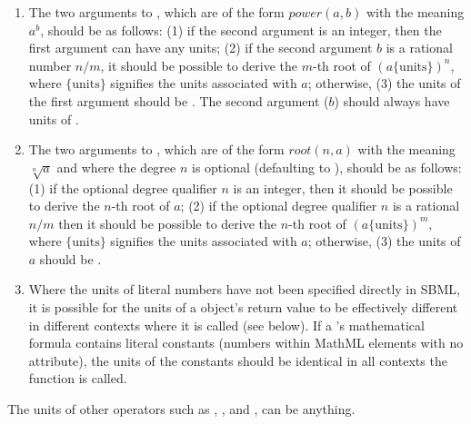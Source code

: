 \begin{enumerate}
\item The two arguments to , which are of the form
  $\textit{power}(a,b)$ with the meaning $a^b$, should be as
  follows: (1) if the second argument is an integer, then the
  first argument can have any units; (2) if the second argument
  $b$ is a rational number $n/m$, it should be possible to derive
  the $m$-th root of $(a \{\text{units}\})^n$, where
  $\{\text{units}\}$ signifies the units associated with $a$;
  otherwise, (3) the units of the first argument should be
  .  The second argument ($b$) should always
  have units of .

\item The two arguments to , which are of the form
  $\textit{root}(n,a)$ with the meaning $\sqrt[n]{a}$ and where
  the degree $n$ is optional (defaulting to ), should be as
  follows: (1) if the optional degree qualifier $n$ is an integer,
  then it should be possible to derive the $n$-th root of $a$; (2)
  if the optional degree qualifier $n$ is a rational $n/m$ then it
  should be possible to derive the $n$-th root of $(a
  \{\text{units}\})^m$, where $\{\text{units}\}$ signifies the
  units associated with $a$; otherwise, (3) the units of $a$ should
  be .

\item Where the units of literal numbers have not been specified
  directly in SBML, it is possible for the units of a
  \FunctionDefinition object's return value to be effectively
  different in different contexts where it is called (see below).  If a
  \FunctionDefinition's mathematical formula contains literal
  constants (\ie numbers within MathML  elements with no
   attribute), the
  units of the constants should be identical in all contexts the
  function is called.

\end{enumerate}

The units of other operators such as , ,
and , can be anything.

